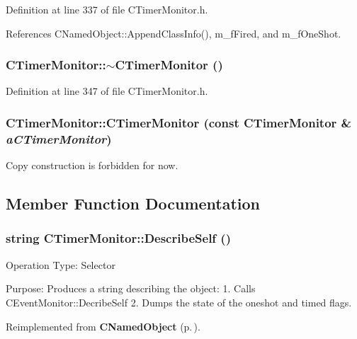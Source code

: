 Definition at line 337 of file CTimer\-Monitor.h.

References CNamed\-Object::Append\-Class\-Info(), m\_\-f\-Fired, and m\_\-f\-One\-Shot.
\subsubsection{\setlength{\rightskip}{0pt plus 5cm}CTimer\-Monitor::$\sim$CTimer\-Monitor ()\hspace{0.3cm}{\tt  [inline]}}\label{classCTimerMonitor_a3}




Definition at line 347 of file CTimer\-Monitor.h.
\subsubsection{\setlength{\rightskip}{0pt plus 5cm}CTimer\-Monitor::CTimer\-Monitor (const CTimer\-Monitor \& {\em a\-CTimer\-Monitor})\hspace{0.3cm}{\tt  [private]}}\label{classCTimerMonitor_c0}


Copy construction is forbidden for now.



\subsection{Member Function Documentation}
\subsubsection{\setlength{\rightskip}{0pt plus 5cm}string CTimer\-Monitor::Describe\-Self ()\hspace{0.3cm}{\tt  [virtual]}}\label{classCTimerMonitor_a10}


Operation Type: Selector

Purpose: Produces a string describing the object: 1. Calls CEvent\-Monitor::Decribe\-Self 2. Dumps the state of the oneshot and timed flags. 

Reimplemented from {\bf CNamed\-Object} {\rm (p.\,\pageref{classCNamedObject_a8})}.

